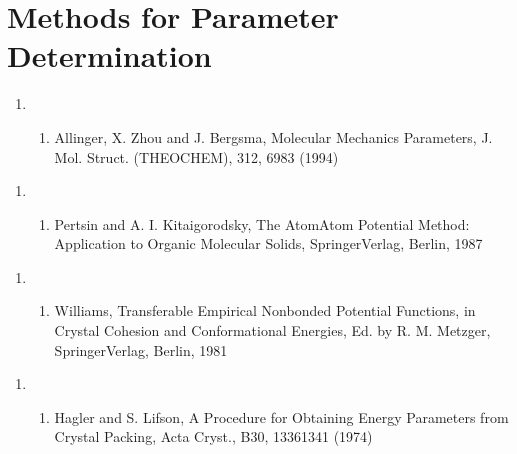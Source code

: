 \documentclass[letterpaper,11pt,english]{sphinxmanual}
\begin{document}
\section{Methods for Parameter Determination}
\label{\detokenize{text/references:methods-for-parameter-determination}}\begin{enumerate}
%
\setcounter{enumi}{13}
\item {} \begin{enumerate}
%
\setcounter{enumii}{11}
\item {} 
Allinger, X. Zhou and J. Bergsma, Molecular Mechanics Parameters, J. Mol. Struct. (THEOCHEM), 312, 69\sphinxhyphen{}83 (1994)

\end{enumerate}

\end{enumerate}
\begin{enumerate}
%
\item {} \begin{enumerate}
%
\setcounter{enumii}{9}
\item {} 
Pertsin and A. I. Kitaigorodsky, The Atom\sphinxhyphen{}Atom Potential Method: Application to Organic Molecular Solids, Springer\sphinxhyphen{}Verlag, Berlin, 1987

\end{enumerate}

\end{enumerate}
\begin{enumerate}
%
\setcounter{enumi}{3}
\item {} \begin{enumerate}
%
\setcounter{enumii}{4}
\item {} 
Williams, Transferable Empirical Nonbonded Potential Functions, in Crystal Cohesion and Conformational Energies, Ed. by R. M. Metzger, Springer\sphinxhyphen{}Verlag, Berlin, 1981

\end{enumerate}

\end{enumerate}
\begin{enumerate}
%
\item {} \begin{enumerate}
%
\setcounter{enumii}{19}
\item {} 
Hagler and S. Lifson, A Procedure for Obtaining Energy Parameters from Crystal Packing, Acta Cryst., B30, 1336\sphinxhyphen{}1341 (1974)

\end{enumerate}

\end{enumerate}
\end{document}
